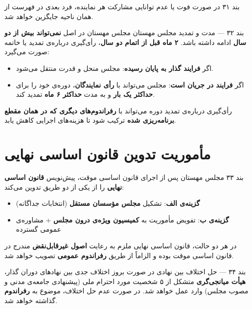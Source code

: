 \begin{bandbox}{بند ۳۱}
	در صورت فوت یا عدم توانایی مشارکت هر نماینده، فرد بعدی در فهرست از همان ناحیه
	جایگزین خواهد شد.
\end{bandbox}

\begin{bandbox}{بند ۳۲ --- مدت و تمدید مجلس مهستان}
	مجلس مهستان در اصل \textbf{نمی‌تواند بیش از دو سال} ادامه داشته باشد.
	\textbf{۲ ماه قبل از اتمام دو سال}، رأی‌گیری درباره‌ی تمدید یا خاتمه صورت می‌گیرد:
	
	\begin{itemize}
		\item اگر \textbf{فرایند گذار به پایان رسیده}: مجلس منحل و قدرت منتقل می‌شود.
		\item اگر \textbf{فرایند در جریان است}: مجلس می‌تواند با \textbf{رأی  نمایندگان}،
		دوره‌ی خود را برای \textbf{حداکثر یک بار} و به مدت \textbf{حداکثر ۶ ماه} تمدید کند.
	\end{itemize}
	
	\begin{infobox}
		رأی‌گیری درباره‌ی تمدید دوره می‌تواند با \textbf{رفراندوم‌های دیگری که در همان
			مقطع برنامه‌ریزی شده} ترکیب شود تا هزینه‌های اجرایی کاهش یابد.
	\end{infobox}
\end{bandbox}

\section{مأموریت تدوین قانون اساسی نهایی}

\begin{bandbox}{بند ۳۳}
	مجلس مهستان پس از اجرای قانون اساسی موقت، پیش‌نویس \textbf{قانون اساسی نهایی}
	را از یکی از دو طریق تدوین می‌کند:
	\begin{itemize}
		\item \textbf{گزینه‌ی الف}: تشکیل \textbf{مجلس مؤسسان مستقل} (انتخابات جداگانه)
		\item \textbf{گزینه‌ی ب}: تفویض مأموریت به \textbf{کمیسیون ویژه‌ی درون مجلس}
		+ مشاوره‌ی عمومی گسترده
	\end{itemize}
	در هر دو حالت، قانون اساسی نهایی ملزم به رعایت \textbf{اصول غیرقابل‌نقض} مندرج
	در قانون اساسی موقت بوده و الزاماً از طریق \textbf{رفراندوم عمومی} تصویب خواهد شد.
\end{bandbox}

\begin{bandbox}{بند ۳۴ --- حل اختلاف بین نهادی}
	در صورت بروز اختلاف جدی بین نهادهای دوران گذار، \textbf{هیأت میانجی‌گری} متشکل
	از ۵ شخصیت مورد احترام ملی (پیشنهادی جامعه‌ی مدنی و مصوب مجلس) وارد عمل خواهد
	شد. در صورت عدم حل اختلاف، موضوع به \textbf{رفراندوم} گذاشته خواهد شد.
\end{bandbox}

